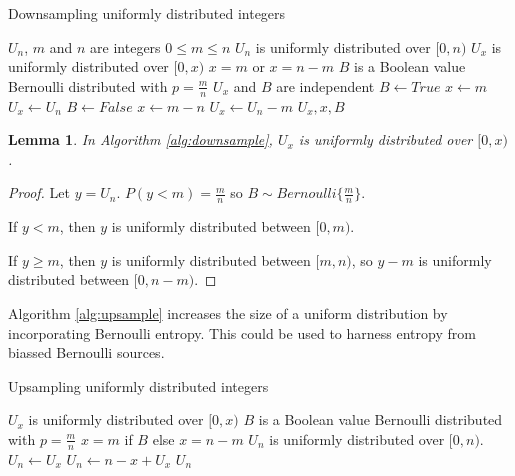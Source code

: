 \documentclass[12pt]{article}
\newtheorem{lemma}{Lemma}
\begin{document}
\begin{algorithm}
\caption{Downsampling uniformly distributed integers}
\label{alg:downsample}
\begin{algorithmic}[1]
    \Require $U_{n}$, $m$ and $n$ are integers 
    \Require $0 \le m \le n$
    \Require $U_{n}$ is uniformly distributed over $[0,n)$
\Ensure $U_{x}$ is uniformly distributed over $[0,x)$
\Ensure $x = m$ or $x=n-m$
\Ensure $B$ is a Boolean value Bernoulli distributed with $p=\frac{m}{n}$
\Ensure $U_x$ and $B$ are independent
    \State $B \gets True$  
    \State $x \gets m$
    \State $U_x \gets U_n$
  \Else
    \State $B \gets False$  
    \State $x \gets m-n$
    \State $U_x \gets U_n-m$
  \EndIf
  \State \Return $U_x, x, B$
\EndProcedure
\end{algorithmic}
\end{algorithm}

\begin{lemma}
In Algorithm \ref{alg:downsample}, $U_x$ is uniformly distributed over $[0,x)$.
\label{lem:downsample}
\end{lemma}

\begin{proof}
    Let $y = U_n$.
    $P(y<m) = \frac{m}{n}$ so $B \sim Bernoulli\{\frac{m}{n}\}$.

If $y < m$, then $y$ is uniformly distributed between $[0,m)$.

If $y \ge m$, then $y$ is uniformly distributed between $[m, n)$, so $y-m$ is uniformly distributed between $[0, n-m)$.
\end{proof}

Algorithm \ref{alg:upsample} increases the size of a uniform distribution by incorporating Bernoulli entropy. This could be used to harness entropy from biassed Bernoulli sources.

\begin{algorithm}
\caption{Upsampling uniformly distributed integers}
\label{alg:upsample}
\begin{algorithmic}[1]
\Require $U_x$ is uniformly distributed over $[0,x)$
\Require $B$ is a Boolean value Bernoulli distributed with $p=\frac{m}{n}$
\Require $x=m$ if $B$ else $x=n-m$
\Ensure $U_n$ is uniformly distributed over $[0,n)$.
    \State $U_n \gets U_x$  
  \Else
    \State $U_n \gets n-x+U_x$  
  \EndIf
  \State \Return $U_n$
\EndProcedure
\end{algorithmic}
\end{algorithm}
\end{document}
